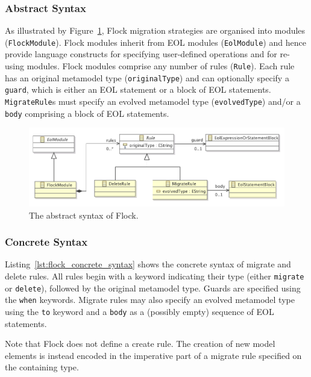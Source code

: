 \subsubsection{Abstract Syntax}
\label{subsubsec:abstract_syntax}
As illustrated by Figure~\ref{fig:abstract_syntax}, Flock migration strategies are organised into modules (\texttt{Fl\-ockMo\-du\-le}). Flock modules inherit from EOL modules (\texttt{Eo\-lMod\-ule}) and hence provide language constructs for specifying user-defined operations and for re-using modules. Flock modules comprise any number of rules (\texttt{Ru\-le}). Each rule has an original metamodel type (\texttt{or\-ig\-in\-alTy\-pe}) and can optionally specify a \texttt{gu\-ard}, which is either an EOL statement or a block of EOL statements. \texttt{Mi\-gr\-ateRu\-le}s must specify an evolved metamodel type (\texttt{ev\-ol\-vedTy\-pe}) and/or a \texttt{bo\-dy} comprising a block of EOL statements.

\begin{figure}[htb]
  \centering
  \includegraphics[scale=0.75]{5.Implementation/flock_abstract_syntax.pdf}
  \caption{The abstract syntax of Flock.}
  \label{fig:abstract_syntax}
\end{figure}

\subsubsection{Concrete Syntax}
\label{subsubsec:concrete_syntax}

Listing~\ref{lst:flock_concrete_syntax} shows the concrete syntax of migrate and delete rules. All rules begin with a keyword indicating their type (either \texttt{migrate} or \texttt{delete}), followed by the original metamodel type. Guards are specified using the \texttt{when} keywords. Migrate rules may also specify an evolved metamodel type using the \texttt{to} keyword and a \texttt{body} as a (possibly empty) sequence of EOL statements.

Note that Flock does not define a create rule. The creation of new model elements is instead encoded in the imperative part of a migrate rule specified on the containing type.

